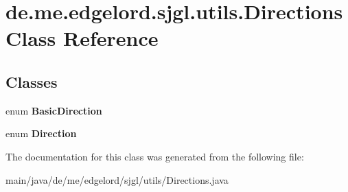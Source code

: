 \hypertarget{classde_1_1me_1_1edgelord_1_1sjgl_1_1utils_1_1_directions}{}\section{de.\+me.\+edgelord.\+sjgl.\+utils.\+Directions Class Reference}
\label{classde_1_1me_1_1edgelord_1_1sjgl_1_1utils_1_1_directions}
\subsection*{Classes}
\begin{DoxyCompactItemize}
\item 
enum {\bfseries Basic\+Direction}
\item 
enum {\bfseries Direction}
\end{DoxyCompactItemize}


The documentation for this class was generated from the following file\+:\begin{DoxyCompactItemize}
\item 
main/java/de/me/edgelord/sjgl/utils/Directions.\+java\end{DoxyCompactItemize}
